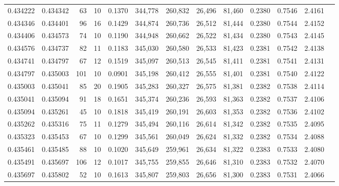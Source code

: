 \begin{tabular}{rrrrrrrrrrrrr}
0.434222 & 0.434342 &    63 &  10 &                                     0.1370 & 344,778 & 260,832 &  26,496 &  81,460 & 0.2380 & 0.7546 & 2.4161 \\
0.434346 & 0.434401 &    96 &  16 &                                     0.1429 & 344,874 & 260,736 &  26,512 &  81,444 & 0.2380 & 0.7544 & 2.4152 \\
0.434406 & 0.434573 &    74 &  10 &                                     0.1190 & 344,948 & 260,662 &  26,522 &  81,434 & 0.2380 & 0.7543 & 2.4145 \\
0.434576 & 0.434737 &    82 &  11 &                                     0.1183 & 345,030 & 260,580 &  26,533 &  81,423 & 0.2381 & 0.7542 & 2.4138 \\
0.434741 & 0.434797 &    67 &  12 &                                     0.1519 & 345,097 & 260,513 &  26,545 &  81,411 & 0.2381 & 0.7541 & 2.4131 \\
0.434797 & 0.435003 &   101 &  10 &                                     0.0901 & 345,198 & 260,412 &  26,555 &  81,401 & 0.2381 & 0.7540 & 2.4122 \\
0.435003 & 0.435041 &    85 &  20 &                                     0.1905 & 345,283 & 260,327 &  26,575 &  81,381 & 0.2382 & 0.7538 & 2.4114 \\
0.435041 & 0.435094 &    91 &  18 &                                     0.1651 & 345,374 & 260,236 &  26,593 &  81,363 & 0.2382 & 0.7537 & 2.4106 \\
0.435094 & 0.435261 &    45 &  10 &                                     0.1818 & 345,419 & 260,191 &  26,603 &  81,353 & 0.2382 & 0.7536 & 2.4102 \\
0.435262 & 0.435316 &    75 &  11 &                                     0.1279 & 345,494 & 260,116 &  26,614 &  81,342 & 0.2382 & 0.7535 & 2.4095 \\
0.435323 & 0.435453 &    67 &  10 &                                     0.1299 & 345,561 & 260,049 &  26,624 &  81,332 & 0.2382 & 0.7534 & 2.4088 \\
0.435461 & 0.435485 &    88 &  10 &                                     0.1020 & 345,649 & 259,961 &  26,634 &  81,322 & 0.2383 & 0.7533 & 2.4080 \\
0.435491 & 0.435697 &   106 &  12 &                                     0.1017 & 345,755 & 259,855 &  26,646 &  81,310 & 0.2383 & 0.7532 & 2.4070 \\
0.435697 & 0.435802 &    52 &  10 &                                     0.1613 & 345,807 & 259,803 &  26,656 &  81,300 & 0.2383 & 0.7531 & 2.4066 \\

\end{tabular}
